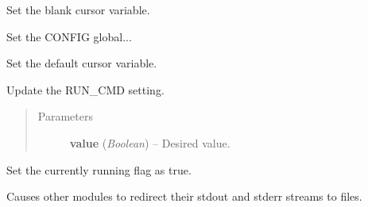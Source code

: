 \documentclass[letterpaper,10pt,english]{sphinxmanual}
\begin{document}

\begin{fulllineitems}
\label{diwavars:diwavars.set_blank_cursor}
Set the blank cursor variable.

\end{fulllineitems}


\begin{fulllineitems}
\label{diwavars:diwavars.set_config}
Set the CONFIG global...

\end{fulllineitems}


\begin{fulllineitems}
\label{diwavars:diwavars.set_default_cursor}
Set the default cursor variable.

\end{fulllineitems}


\begin{fulllineitems}
\label{diwavars:diwavars.set_run_cmd}
Update the RUN\_CMD setting.
\begin{quote}\begin{description}
\item[{Parameters}] \leavevmode
\textbf{value} (\emph{Boolean}) -- Desired value.

\end{description}\end{quote}

\end{fulllineitems}


\begin{fulllineitems}
\label{diwavars:diwavars.set_running}
Set the currently running flag as true.

Causes other modules to redirect their stdout and stderr streams
to files.

\end{fulllineitems}
\end{document}
